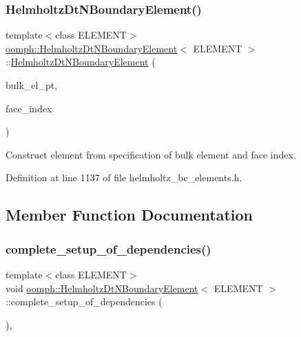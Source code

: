 \subsubsection{\texorpdfstring{Helmholtz\+Dt\+N\+Boundary\+Element()}{HelmholtzDtNBoundaryElement()}}
{\footnotesize\ttfamily template$<$class E\+L\+E\+M\+E\+NT$>$ \\
\hyperlink{classoomph_1_1HelmholtzDtNBoundaryElement}{oomph\+::\+Helmholtz\+Dt\+N\+Boundary\+Element}$<$ E\+L\+E\+M\+E\+NT $>$\+::\hyperlink{classoomph_1_1HelmholtzDtNBoundaryElement}{Helmholtz\+Dt\+N\+Boundary\+Element} (\begin{DoxyParamCaption}\item[{\hyperlink{classoomph_1_1FiniteElement}{Finite\+Element} $\ast$const \&}]{bulk\+\_\+el\+\_\+pt,  }\item[{const int \&}]{face\+\_\+index }\end{DoxyParamCaption})\hspace{0.3cm}{\ttfamily [inline]}}



Construct element from specification of bulk element and face index. 



Definition at line 1137 of file helmholtz\+\_\+bc\+\_\+elements.\+h.



\subsection{Member Function Documentation}
\mbox{\label{classoomph_1_1HelmholtzDtNBoundaryElement_aefb821cc3b61a602ab5ca9dd9d843a63}} 
\subsubsection{\texorpdfstring{complete\+\_\+setup\+\_\+of\+\_\+dependencies()}{complete\_setup\_of\_dependencies()}}
{\footnotesize\ttfamily template$<$class E\+L\+E\+M\+E\+NT$>$ \\
void \hyperlink{classoomph_1_1HelmholtzDtNBoundaryElement}{oomph\+::\+Helmholtz\+Dt\+N\+Boundary\+Element}$<$ E\+L\+E\+M\+E\+NT $>$\+::complete\+\_\+setup\+\_\+of\+\_\+dependencies (\begin{DoxyParamCaption}{ }\end{DoxyParamCaption})\hspace{0.3cm}{\ttfamily [inline]}, {\ttfamily [virtual]}}



